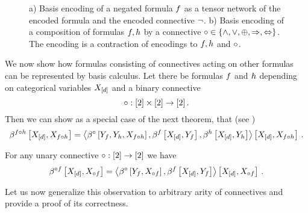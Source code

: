 \begin{figure}[h]
\begin{center}
	
\end{center}
\caption{a) Basis encoding of a negated formula $f$ as a tensor network of the encoded formula and the encoded connective $\lnot$.
	b) Basis encoding of a composition of formulas $f, h$ by a connective $\circ\in\{\land,\lor,\oplus,\Rightarrow,\Leftrightarrow\}$.
	The encoding is a contraction of encodings to  $f, h$ and $\circ$.}
	\label{fig:unaryBinaryComposition} 
\end{figure}

We now show how formulas consisting of connectives acting on other formulas can be represented by basis calculus.
Let there be formulas $f$ and $h$ depending on categorical variables $X_{[d]}$ and a binary connective
	\[ \circ: [2]\times[2] \rightarrow[2] \, . \]
Then we can show as a special case of the next theorem, that (see )
\begin{align*}
	\beta^{f\circ h}\left[X_{[d]},X_{f\circ h}\right]
	= \left\langle 
	\beta^{\circ}\left[Y_{f},Y_{h},X_{f\circ h}\right],
	\beta^{f}\left[X_{[d]},Y_{f}\right],
	\beta^{h}\left[X_{[d]},Y_{h}\right]
	\right\rangle \left[ 
	X_{[d]},X_{f\circ h}
	 \right] \, . 
\end{align*}

For any unary connective $\circ: [2] \rightarrow[2]$ we have
\begin{align*}
	\beta^{\circ f}\left[X_{[d]},X_{\circ f}\right]
	= \left\langle 
	\beta^{\circ}\left[Y_{f},X_{\circ f}\right],
	\beta^{f}\left[X_{[d]},Y_{f}\right]
	\right\rangle \left[ 
	X_{[d]},X_{\circ f} \right] \, . 
\end{align*}

Let us now generalize this observation to arbitrary arity of connectives and provide a proof of its correctness.

